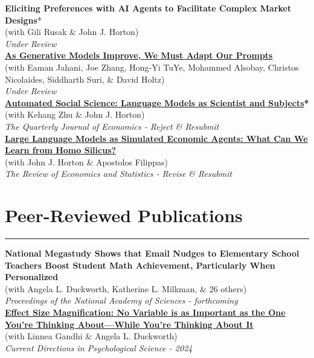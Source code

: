 \documentclass[11.25pt]{article}
\begin{document}
\noindent\textbf{Eliciting Preferences with AI Agents to Facilitate Complex Market Designs}*\\ 
(with Gili Rusak \& John J. Horton)\\
\textit{Under Review}\\

\noindent\textbf{\href{https://arxiv.org/abs/2407.14333}{As Generative Models Improve, We Must Adapt Our Prompts}} \\ (with Eaman Jahani, Joe Zhang, Hong-Yi TuYe, Mohammed Alsobay, Christos Nicolaides, Siddharth
Suri, \& David Holtz)\\
\textit{Under Review}\\

\noindent\textbf{\href{https://www.nber.org/papers/w32381}{Automated Social Science: Language Models as Scientist and Subjects}*}\\ 
(with Kehang Zhu \& John J. Horton)\\
\textit{The Quarterly Journal of Economics - Reject \& Resubmit}\\

\noindent\href{https://www.nber.org/papers/w31122}{\textbf{Large Language Models as Simulated Economic Agents: What Can We Learn from Homo Silicus?}} \\ (with John J. Horton \& Apostolos Filippas) \\
\textit{The Review of Economics and Statistics - Revise \& Resubmit}\\

\section*{Peer-Reviewed Publications} \vspace{-1mm} \hrule
\vspace{3mm}

\noindent \textbf{National Megastudy Shows that Email Nudges to Elementary School Teachers Boost Student Math Achievement, Particularly When Personalized} \\
(with Angela L. Duckworth, Katherine L. Milkman, \& 26 others) \\
\textit{Proceedings of the National Academy of Sciences - forthcoming}\\

\noindent \textbf{\href{https://journals.sagepub.com/doi/full/10.1177/09637214241268222}{Effect Size Magnification: No Variable is as Important as the One You’re Thinking About—While You’re Thinking About It}} \\
(with Linnea Gandhi \& Angela L. Duckworth)\\
\textit{Current Directions in Psychological Science - 2024}
\end{document}
